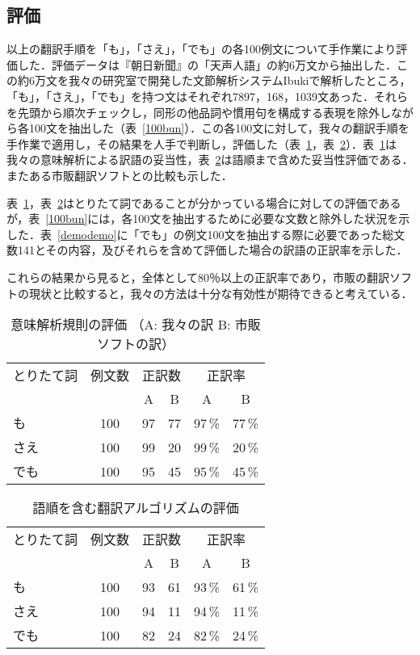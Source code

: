 \subsection{評価}
以上の翻訳手順を「も」，「さえ」，「でも」の各100例文について手作業により評価した．評価データは『朝日新聞』の「天声人語」の約6万文から抽出した．この約6万文を我々の研究室で開発した文節解析システムIbukiで解析したところ，「も」，「さえ」，「でも」を持つ文はそれぞれ7897，168，1039文あった．それらを先頭から順次チェックし，同形の他品詞や慣用句を構成する表現を除外しながら各100文を抽出した（表~\ref{100bun}）．この各100文に対して，我々の翻訳手順を手作業で適用し，その結果を人手で判断し，評価した（表~\ref{hyouka}，表~\ref{algo}）．表~\ref{hyouka}は我々の意味解析による訳語の妥当性，表~\ref{algo}は語順まで含めた妥当性評価である．またある市販翻訳ソフトとの比較も示した．

表~\ref{hyouka}，表~\ref{algo}はとりたて詞であることが分かっている場合に対しての評価であるが，表~\ref{100bun}には，各100文を抽出するために必要な文数と除外した状況を示した．表~\ref{demodemo}に「でも」の例文100文を抽出する際に必要であった総文数141とその内容，及びそれらを含めて評価した場合の訳語の正訳率を示した．

これらの結果から見ると，全体として80％以上の正訳率であり，市販の翻訳ソフトの現状と比較すると，我々の方法は十分な有効性が期待できると考えている．

  \begin{table}[htbp]
 \caption{意味解析規則の評価 （A: 我々の訳 B: 市販ソフトの訳）}
 \label{hyouka}
 \begin{center}
 \begin{tabular}{|l|c|c|c|c|c|} \hline
  \multicolumn{1}{|c|}{とりたて詞} & 例文数 & \multicolumn{2}{|c|}{正訳数} & \multicolumn{2}{|c|}{正訳率} \\ \cline{3-6}
  & & A & B & A & B \\ \hline
  も & 100 & 97 & 77 & 97\,\% & 77\,\% \\ \hline
  さえ & 100 & 99 & 20 & 99\,\% & 20\,\% \\ \hline
  でも & 100 & 95 & 45 & 95\,\% & 45\,\% \\ \hline
 \end{tabular}
 \end{center}
 \end{table}

  \begin{table}[htbp]
 \begin{center}
 \caption{語順を含む翻訳アルゴリズムの評価}
 \label{algo}
  \begin{tabular}{|l|c|c|c|c|c|} \hline
  \multicolumn{1}{|c|}{とりたて詞} & 例文数 & \multicolumn{2}{|c|}{正訳数} & \multicolumn{2}{|c|}{正訳率} \\ \cline{3-6}
  & & A & B & A & B \\ \hline
  も & 100 & 93 & 61 & 93\,\% & 61\,\% \\ \hline
  さえ & 100 & 94 & 11 & 94\,\% & 11\,\% \\ \hline
  でも & 100 & 82 & 24 & 82\,\% & 24\,\% \\ \hline
 \end{tabular}
 \end{center}
 \end{table}

